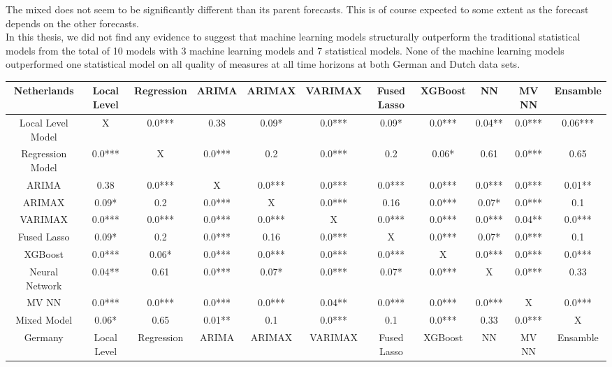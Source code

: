 The mixed does not seem to be significantly different than its parent forecasts. This is of course expected to some extent as the forecast depends on the other forecasts.\\

In this thesis, we did not find any evidence to suggest that machine learning models structurally outperform the traditional statistical models from the total of 10 models with 3 machine learning models and 7 statistical models. None of the machine learning models outperformed one statistical model on all quality of measures at all time horizons at both German and Dutch data sets.\\

\begin{landscape}
\pagestyle{empty}
\begin{table}[]
    \centering
    \begin{tabular}{|c|c c c c c c c c c c|}\hline
        Netherlands &  Local Level & Regression & ARIMA & ARIMAX & VARIMAX & Fused Lasso & XGBoost & NN & MV NN & Ensamble\\\hline
        Local Level Model & X & 0.0*** & 0.38 & 0.09* & 0.0*** & 0.09* & 0.0*** & 0.04** & 0.0*** & 0.06***\\
        Regression Model & 0.0*** & X & 0.0*** & 0.2 & 0.0*** & 0.2 & 0.06* & 0.61 & 0.0*** & 0.65\\
        ARIMA & 0.38 & 0.0*** & X & 0.0*** & 0.0*** & 0.0*** & 0.0*** & 0.0*** & 0.0*** & 0.01**\\
        ARIMAX & 0.09* & 0.2 & 0.0*** & X & 0.0*** & 0.16 & 0.0*** & 0.07* & 0.0*** & 0.1\\
        VARIMAX & 0.0*** & 0.0*** & 0.0*** & 0.0*** & X & 0.0*** & 0.0*** & 0.0*** & 0.04** & 0.0***\\
        Fused Lasso & 0.09* & 0.2 & 0.0*** & 0.16 & 0.0*** & X & 0.0*** & 0.07* & 0.0*** & 0.1\\
        XGBoost & 0.0*** & 0.06* & 0.0*** & 0.0*** & 0.0*** & 0.0*** & X & 0.0*** & 0.0*** & 0.0***\\
        Neural Network & 0.04** & 0.61 & 0.0*** & 0.07* & 0.0*** & 0.07* & 0.0*** & X & 0.0*** & 0.33\\
        MV NN & 0.0*** & 0.0*** & 0.0*** & 0.0*** & 0.04** & 0.0*** & 0.0*** & 0.0*** & X & 0.0***\\
        Mixed Model & 0.06* & 0.65 & 0.01** & 0.1 & 0.0*** & 0.1 & 0.0*** & 0.33 & 0.0*** & X\\
        \hline\hline
        Germany &  Local Level & Regression & ARIMA & ARIMAX & VARIMAX & Fused Lasso & XGBoost & NN & MV NN & Ensamble\\\hline

\end{tabular}
\end{table}
\end{landscape}

